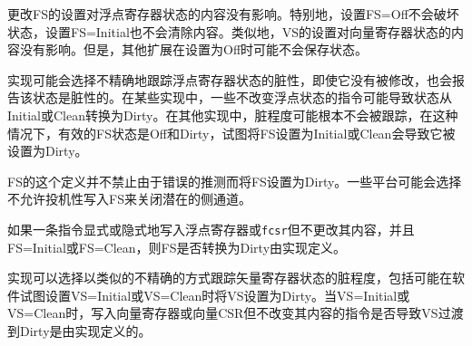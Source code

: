 更改FS的设置对浮点寄存器状态的内容没有影响。特别地，设置FS=Off不会破坏状态，设置FS=Initial也不会清除内容。类似地，VS的设置对向量寄存器状态的内容没有影响。但是，其他扩展在设置为Off时可能不会保存状态。

实现可能会选择不精确地跟踪浮点寄存器状态的脏性，即使它没有被修改，也会报告该状态是脏性的。在某些实现中，一些不改变浮点状态的指令可能导致状态从Initial或Clean转换为Dirty。在其他实现中，脏程度可能根本不会被跟踪，在这种情况下，有效的FS状态是Off和Dirty，试图将FS设置为Initial或Clean会导致它被设置为Dirty。

\iffalse
\begin{commentary}
This definition of FS does not disallow setting FS to Dirty as a result of
errant speculation.  Some platforms may choose to disallow speculatively
writing FS to close a potential side channel.
\end{commentary}
\fi

\begin{commentary}
FS的这个定义并不禁止由于错误的推测而将FS设置为Dirty。一些平台可能会选择不允许投机性写入FS来关闭潜在的侧通道。
\end{commentary}

\iffalse
If an instruction explicitly or implicitly writes a floating-point register or
the {\tt fcsr} but does not alter its contents, and FS=Initial or FS=Clean, it
is implementation-defined whether FS transitions to Dirty.

Implementations may choose to track the dirtiness of the vector register state in an
analogous imprecise fashion, including possibly setting VS to Dirty when
software attempts to set VS=Initial or VS=Clean.
When VS=Initial or VS=Clean, it is implementation-defined whether an
instruction that writes a vector register or vector CSR but does not alter its
contents causes VS to transition to Dirty.

Table~\ref{fsxsstates} shows all the possible state transitions for
the FS, VS, or XS status bits.  Note that the standard floating-point
and vector extensions do not support user-mode unconfigure or disable/enable
instructions.
\fi

如果一条指令显式或隐式地写入浮点寄存器或{\tt fcsr}但不更改其内容，并且FS=Initial或FS=Clean，则FS是否转换为Dirty由实现定义。

实现可以选择以类似的不精确的方式跟踪矢量寄存器状态的脏程度，包括可能在软件试图设置VS=Initial或VS=Clean时将VS设置为Dirty。当VS=Initial或VS=Clean时，写入向量寄存器或向量CSR但不改变其内容的指令是否导致VS过渡到Dirty是由实现定义的。

